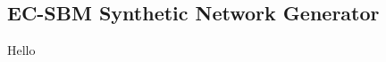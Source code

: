 \documentclass[../../main/main.tex]{subfiles}
\begin{document}
\subsection*{EC-SBM Synthetic Network Generator}

Hello ~\cite{vule25-02}

\bibsub
\end{document}
